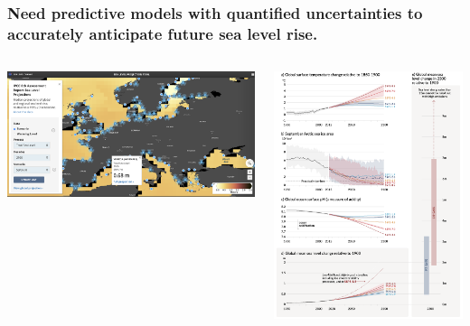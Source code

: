 \documentclass[10pt,final,xcolor=dvipsnames,aspect ratio=169]{beamer}
\begin{document}
\begin{frame}
	\frametitle{Need predictive models with quantified uncertainties to accurately anticipate future sea
		level rise.}
	\begin{columns}
		\begin{column}{0.7\paperwidth}
			\centering\includegraphics[width=0.75\columnwidth]{extraplots/venezia}
		\end{column}
		\hspace{-0.4in}
		\begin{column}{0.3\paperwidth}
			\vspace{0.1in}
			\centering\includegraphics[width=0.75\columnwidth]{extraplots/ipcc-ar6-wgi-2021.png}
		\end{column}
	\end{columns}
	

\end{frame}
\end{document}
